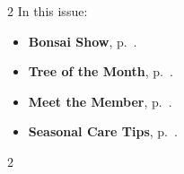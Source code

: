 \setlength{\columnsep}{-5.0cm}
\begin{multicols}{2}
    \noindent\textsf{In this issue:}
    \begin{itemize}
        \item \textsf{\textbf{Bonsai Show}}, p.~\pageref{2025-10-show}.
        \item \textsf{\textbf{Tree of the Month}}, p.~\pageref{2025-10-contest}.
        \item \textsf{\textbf{Meet the Member}}, p.~\pageref{2025-10-roots}.
        \item \textsf{\textbf{Seasonal Care Tips}}, p.~\pageref{2025-10-care}.
    \end{itemize}
    \vfill\null
    \columnbreak

    
\end{multicols}
\pagebreak

\setlength{\columnsep}{0.5cm}
\begin{multicols}{2}
    
    
%    
%    
    
    
%    
\end{multicols}
